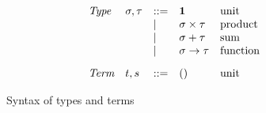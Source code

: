 \begin{figure}
  \small
  \[
  \begin{array}{lllll}
    \textit{Type} &
    \sigma, \tau
    & ::= &
    \mathbf{1}
    &
    \text{unit}
    \\
    && | &
    \sigma \times \tau
    &
    \text{product}
    \\
    && | &
    \sigma + \tau
    &
    \text{sum}
    \\
    && | &
    \sigma \to \tau
    &
    \text{function}
    \\[3mm]
    \textit{Term} &
    t, s
    & ::= &
    ()
    &
    \text{unit}
  \end{array}
  \]
  \caption{Syntax of types and terms}
\end{figure}
